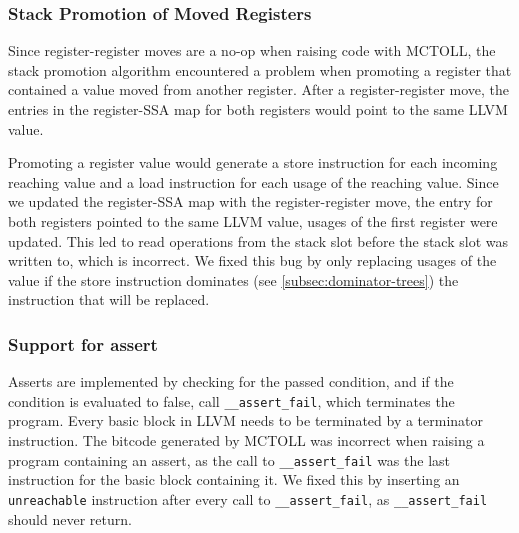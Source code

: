 \subsubsection{Stack Promotion of Moved Registers}

Since register-register moves are a no-op when raising code with MCTOLL, the stack promotion algorithm encountered a problem when promoting a register that contained a value moved from another register.
After a register-register move, the entries in the register-SSA map for both registers would point to the same LLVM value.

Promoting a register value would generate a store instruction for each incoming reaching value and a load instruction for each usage of the reaching value.
Since we updated the register-SSA map with the register-register move, the entry for both registers pointed to the same LLVM value, usages of the first register were updated.
This led to read operations from the stack slot before the stack slot was written to, which is incorrect.
We fixed this bug by only replacing usages of the value if the store instruction dominates (see \cref{subsec:dominator-trees}) the instruction that will be replaced.

\subsubsection{Support for assert}

Asserts are implemented by checking for the passed condition, and if the condition is evaluated to false, call \texttt{\_\_assert\_fail}, which terminates the program.
Every basic block in LLVM needs to be terminated by a terminator instruction.
The bitcode generated by MCTOLL was incorrect when raising a program containing an assert, as the call to \texttt{\_\_assert\_fail} was the last instruction for the basic block containing it.
We fixed this by inserting an \texttt{unreachable} instruction after every call to \texttt{\_\_assert\_fail}, as \texttt{\_\_assert\_fail} should never return.
